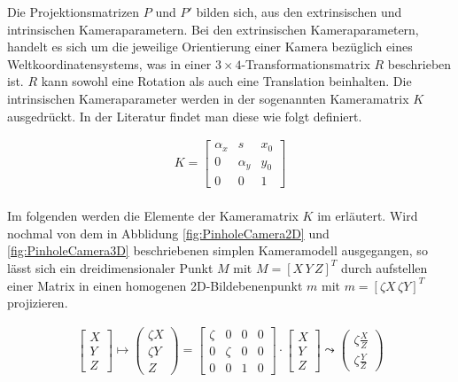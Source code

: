 Die Projektionsmatrizen $P$ und $P'$ bilden sich, aus den extrinsischen und intrinsischen Kameraparametern. Bei den extrinsischen Kameraparametern, handelt es sich um die jeweilige Orientierung einer Kamera bezüglich eines Weltkoordinatensystems, was in einer $3\times 4$-Transformationsmatrix $R$ beschrieben ist. $R$ kann sowohl eine Rotation als auch eine Translation beinhalten. Die intrinsischen Kameraparameter werden in der sogenannten Kameramatrix $K$ ausgedrückt. In der Literatur findet man diese wie folgt definiert\cite{HZ}.

\begin{gather}
K=\begin{bmatrix}
\alpha_x&s&x_{0}\\
0&\alpha_y&y_{0}\\
0&0&1
\end{bmatrix}
\end{gather}\\

Im folgenden werden die Elemente der Kameramatrix $K$ im erläutert. Wird nochmal von dem in Abblidung \ref{fig:PinholeCamera2D} und \ref{fig:PinholeCamera3D} beschriebenen simplen Kameramodell ausgegangen, so lässt sich ein dreidimensionaler Punkt $M$ mit $M = [X\, Y\, Z]^T$ durch aufstellen einer Matrix in einen homogenen 2D-Bildebenenpunkt $m$ mit $m = [\zeta X\, \zeta Y]^T$ projizieren.

\begin{gather}
	\begin{bmatrix}
	X\\Y\\Z
	\end{bmatrix} \mapsto
	\begin{pmatrix}
	\zeta X\\ \zeta Y\\ Z
	\end{pmatrix}
	=
	\begin{bmatrix}
	\zeta&0&0&0\\
	0&\zeta&0&0\\
	0&0&1&0
	\end{bmatrix}
	\cdot
	\begin{bmatrix}
	X\\Y\\Z
	\end{bmatrix}
	\leadsto
	\begin{pmatrix}
	\zeta \frac{X}{Z}\\ \zeta \frac{Y}{Z}
	\end{pmatrix}
\end{gather}\\

